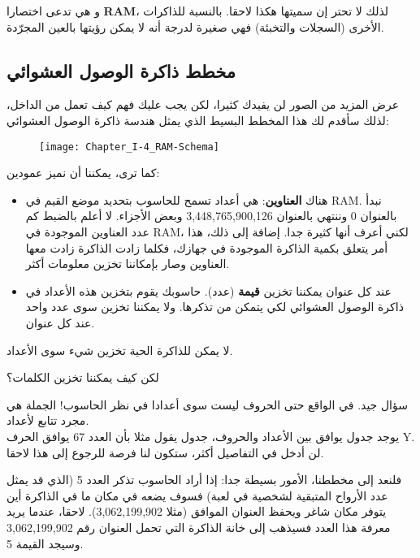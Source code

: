 و هي تدعى اختصارا
\textbf{\textenglish{RAM}}،
لذلك لا تحتر إن سميتها هكذا لاحقا. بالنسبة للذاكرات الأخرى (السجلات والتخبئة) فهي صغيرة لدرجة أنه لا يمكن رؤيتها بالعين المجرّدة.

\subsection{مخطط ذاكرة الوصول العشوائي}

عرض المزيد من الصور لن يفيدك كثيرا، لكن يجب عليك فهم كيف تعمل من الداخل، لذلك سأقدم لك هذا المخطط البسيط الذي يمثل هندسة ذاكرة الوصول العشوائي:

\begin{figure}[H]
	\centering
	\texttt{[image: Chapter\_I-4\_RAM-Schema]}
\end{figure}


كما ترى، يمكننا أن نميز عمودين:

\begin{itemize}
  \item هناك
\textbf{العناوين}:
 هي أعداد تسمح للحاسوب بتحديد موضع القيم في \textenglish{RAM}. نبدأ بالعنوان 0 وننتهي بالعنوان 3,448,765,900,126 وبعض الأجزاء. لا أعلم بالضبط كم عدد العناوين الموجودة في \textenglish{RAM}، لكني أعرف أنها كثيرة جدا. إضافة إلى ذلك، هذا أمر يتعلق بكمية الذاكرة الموجودة في جهازك، فكلما زادت الذاكرة زادت معها العناوين وصار بإمكاننا تخزين معلومات أكثر.
  \item عند كل عنوان يمكننا تخزين
\textbf{قيمة}
(عدد). حاسوبك يقوم بتخزين هذه الأعداد في ذاكرة الوصول العشوائي لكي يتمكن من تذكرها. ولا يمكننا تخزين سوى عدد واحد عند كل عنوان.
\end{itemize}

لا يمكن للذاكرة الحية تخزين شيء سوى الأعداد.

\begin{question}
  لكن كيف يمكننا تخزين الكلمات؟
\end{question}

سؤال جيد. في الواقع حتى الحروف ليست سوى أعدادا في نظر الحاسوب! الجملة هي مجرد تتابع لأعداد.\\
يوجد جدول يوافق بين الأعداد والحروف، جدول يقول مثلا بأن العدد 67 يوافق الحرف
\textenglish{Y}.
لن أدخل في التفاصيل أكثر، ستكون لنا فرصة للرجوع إلى هذا لاحقا.

فلنعد إلى مخططنا، الأمور بسيطة جدا: إذا أراد الحاسوب تذكر العدد 5 (الذي قد يمثل عدد الأرواح المتبقية لشخصية في لعبة) فسوف يضعه في مكان ما في الذاكرة أين يتوفر مكان شاغر ويحفظ العنوان الموافق (مثلا 3,062,199,902). لاحقا، عندما يريد معرفة هذا العدد فسيذهب إلى خانة الذاكرة التي تحمل العنوان رقم 3,062,199,902 وسيجد القيمة 5.

